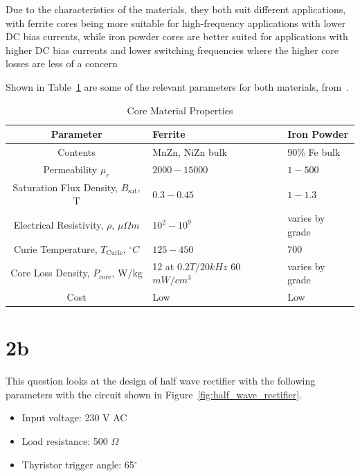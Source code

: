 \documentclass[a4paper, 12pt, titlepage]{report}
\begin{document}
Due to the characteristics of the materials, they both suit different applications, with ferrite cores being more suitable for high-frequency applications with lower DC bias currents, while iron powder cores are better suited for applications with higher DC bias currents and lower switching frequencies where the higher core losses are less of a concern

Shown in Table~\ref{tab:choke_core_materials} are some of the relevant parameters for both materials, from~\cite{week4Lecture}.

\begin{table}[h]
    \centering
    \caption{Core Material Properties}
    \label{tab:choke_core_materials}
    \begin{tabular}{|c|p{4cm}|p{4cm}|}
        \hline
        \textbf{Parameter} & \textbf{Ferrite} & \textbf{Iron Powder} \\
        \hline
        Contents & MnZn, NiZn bulk & 90\% Fe bulk  \\
        Permeability \(\mu_r\) & \(2000 - 15000\) & \(1-500\) \\
        Saturation Flux Density, \(B_{\mathrm{sat}}\), T & \(0.3 - 0.45\) & \(1 - 1.3\) \\
        Electrical Resistivity, \(\rho\), \(\mu \Omega m\) & \(10^2 - 10^9\) & varies by grade \\
        Curie Temperature, \(T_{\mathrm{Curie}}\), \(^\circ C\) & \(125 - 450\) & \(700\) \\
        Core Loss Density, \(P_{\mathrm{core}}\), W/kg & 12 at \(0.2 T/20 kHz \) 60 \(mW/cm^3\) & varies by grade \\
        Cost & Low & Low \\
        \hline
    \end{tabular}
\end{table}
\section{2b}

This question looks at the design of half wave rectifier with the following parameters with the circuit shown in Figure~\ref{fig:half_wave_rectifier}.
\begin{itemize}
    \item Input voltage: 230 V AC
    \item Load resistance: 500 \(\Omega\)
    \item Thyristor trigger angle: 65\(^\circ\)
\end{itemize}
\end{document}
